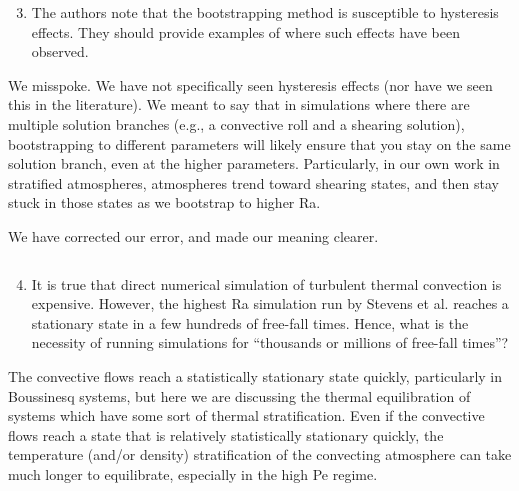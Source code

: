 \documentclass[aps, 11pt, singlecolumn]{revtex4-1} %
\begin{document}
\begin{singlespace}
\begin{myquotation}
$\,$\\\vspace{-1.25cm}
\begin{enumerate}
\setcounter{enumi}{2}
\item The authors note that the bootstrapping method is susceptible to hysteresis effects. They should provide examples of where such effects have been observed.
\end{enumerate}
\end{myquotation}
We misspoke. We have not specifically seen hysteresis effects (nor have we seen
this in the literature).  We meant to say that in simulations where there are
multiple solution branches (e.g., a convective roll and a shearing solution),
bootstrapping to different parameters will likely ensure that you stay on the 
same solution branch, even at the higher parameters. Particularly, in our own
work in stratified atmospheres, atmospheres trend toward shearing states, and then
stay stuck in those states as we bootstrap to higher Ra.

We have corrected our error, and made our meaning clearer.

\begin{myquotation}
$\,$\\\vspace{-1.25cm}
\begin{enumerate}
\setcounter{enumi}{3}
\item It is true that direct numerical simulation of turbulent thermal convection is expensive. However, the highest Ra simulation run by Stevens et al. reaches a stationary state in a few hundreds of free-fall times. Hence, what is the necessity of running simulations for ``thousands or millions of free-fall times''?
\end{enumerate}
\end{myquotation}
The convective flows reach a statistically stationary state quickly, particularly
in Boussinesq systems, but here we are discussing the thermal equilibration
of systems which have some sort of thermal stratification. Even if the convective 
flows reach a state that is relatively statistically stationary quickly, the
temperature (and/or density) stratification of the convecting atmosphere can take
much longer to equilibrate, especially in the high Pe regime.


\end{singlespace}
\end{document}
